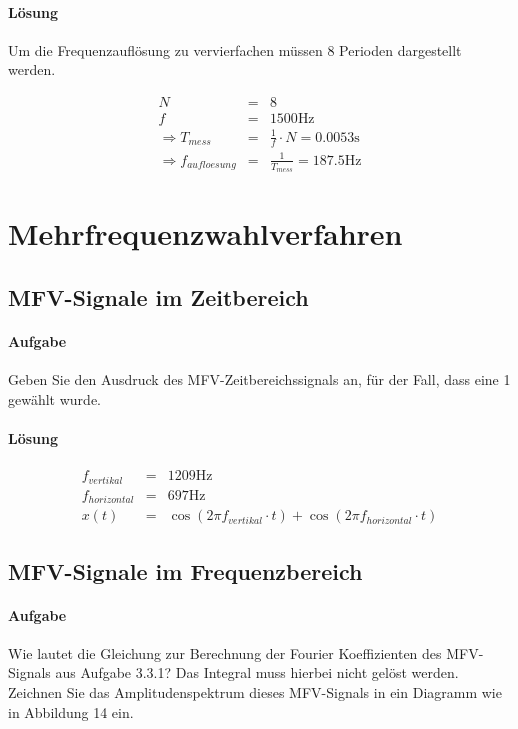 \documentclass[10pt]{scrreprt}
\begin{document}
        \paragraph{Lösung}
        Um die Frequenzauflösung zu vervierfachen müssen 8 Perioden dargestellt werden.

        \begin{eqnarray*}
            N &=& 8\\
            f &=& 1500\si{\hertz}\\
            \Rightarrow T_{mess} &=& \frac{1}{f} \cdot N =  0.0053\si{\second}\\
            \Rightarrow f_{aufloesung} &=& \frac{1}{T_{mess}} = 187.5 \si{\hertz}
        \end{eqnarray*}

        \section{Mehrfrequenzwahlverfahren}
        \subsection{MFV-Signale im Zeitbereich}
        \paragraph{Aufgabe}
        Geben Sie den Ausdruck des MFV-Zeitbereichssignals an, für der Fall, dass eine \glqq{}1\grqq{}
        gewählt wurde.

        \paragraph{Lösung}

        \begin{eqnarray*}
            f_{vertikal} &=& 1209 \si{\hertz}\\
            f_{horizontal} &=& 697 \si{\hertz}\\
            x(t) &=& \cos(2 \pi f_{vertikal} \cdot t) + \cos(2 \pi f_{horizontal} \cdot t)
        \end{eqnarray*}

        \subsection{MFV-Signale im Frequenzbereich}
        \paragraph{Aufgabe}
        Wie lautet die Gleichung zur Berechnung der Fourier Koeffizienten des MFV-Signals aus
        Aufgabe 3.3.1? Das Integral muss hierbei nicht gelöst werden. Zeichnen Sie das Amplitudenspektrum
        dieses MFV-Signals in ein Diagramm wie in Abbildung 14 ein.
\end{document}

